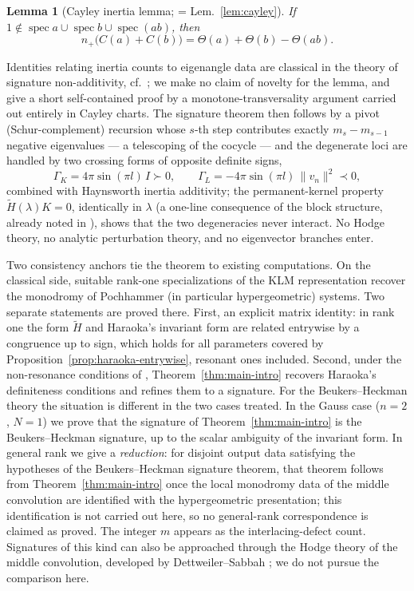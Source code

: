 \documentclass[11pt]{article}
\newtheorem{lemma}[theorem]{Lemma}
\theoremstyle{definition}
\newcommand{\Ht}{\widetilde H}
\begin{document}
\begin{lemma}[Cayley inertia lemma; = Lem.~\ref{lem:cayley}]
\label{lem:cayley-intro}
If $1\notin\operatorname{spec}a\cup\operatorname{spec}b\cup
\operatorname{spec}(ab)$, then
\[
n_{+}\bigl(C(a)+C(b)\bigr)=\Theta(a)+\Theta(b)-\Theta(ab).
\]
\end{lemma}

Identities relating inertia counts to eigenangle data are classical
in the theory of signature non-additivity, cf.\ \cite{Wall}; we make
no claim of novelty for the lemma, and give a short self-contained
proof by a monotone-transversality argument carried out entirely in
Cayley charts.
The signature theorem then follows by a
pivot (Schur-complement) recursion whose $s$-th step contributes
exactly $m_s-m_{s-1}$ negative eigenvalues --- a telescoping of the
cocycle --- and the degenerate loci are handled by two crossing forms
of opposite definite signs,
\[
\Gamma_K=4\pi\sin(\pi l)\,I\succ0,
\qquad
\Gamma_L=-4\pi\sin(\pi l)\,\lVert v_n\rVert^2\prec0,
\]
combined with Haynsworth inertia additivity; the permanent-kernel
property $\Ht(\lambda)K=0$, identically in $\lambda$ (a one-line
consequence of the block structure, already noted in
\cite[Thm.~9]{N-KLM}), shows that the two degeneracies never
interact. No Hodge theory, no
analytic perturbation theory, and no eigenvector branches enter.

Two consistency anchors tie the theorem to existing computations. On
the classical side, suitable rank-one specializations of the KLM
representation recover the monodromy of Pochhammer (in particular
hypergeometric) systems. Two separate statements are proved there.
First, an explicit matrix identity: in rank one the form $\Ht$ and
Haraoka's invariant form \cite{Haraoka1994} are related entrywise by
a congruence up to sign, which holds for all parameters covered by
Proposition~\ref{prop:haraoka-entrywise}, resonant ones included.
Second,
under the non-resonance conditions of \cite{Haraoka1994},
Theorem~\ref{thm:main-intro} recovers Haraoka's definiteness
conditions and refines them to a signature. For the Beukers--Heckman
theory \cite{BH} the situation is different in the two cases treated.
In the Gauss case ($n=2$, $N=1$) we prove that the signature of
Theorem~\ref{thm:main-intro} is the Beukers--Heckman signature, up
to the scalar ambiguity of the invariant form. In
general rank we give a \emph{reduction}: for disjoint output data
satisfying the hypotheses of the Beukers--Heckman signature theorem,
that theorem follows from Theorem~\ref{thm:main-intro} once the local
monodromy data of the middle convolution are identified with the
hypergeometric presentation; this identification is not carried out
here, so no general-rank correspondence is claimed as proved. The
integer $m$ appears as the interlacing-defect count. Signatures of
this kind can also be approached through the Hodge theory of the
middle convolution, developed by Dettweiler--Sabbah \cite{DS}; we do
not pursue the comparison here.
\end{document}
